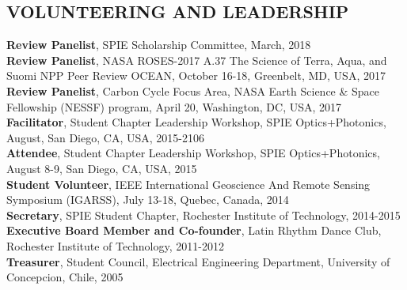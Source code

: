 \documentclass[11pt]{res}
\begin{document}
\begin{resume}
\vspace{-0.1in}
\section{VOLUNTEERING AND LEADERSHIP}
\vspace{0.1in}
{\bf Review Panelist}, SPIE Scholarship Committee, March, 2018
\vspace{0.1in}\\
{\bf Review Panelist}, NASA ROSES-2017 A.37 The Science of Terra, Aqua, and Suomi NPP Peer Review OCEAN, October 16-18, Greenbelt, MD, USA, 2017
\vspace{0.1in}\\
{\bf Review Panelist}, Carbon Cycle Focus Area, NASA Earth Science \& Space Fellowship (NESSF) program, April 20, Washington, DC, USA, 2017
\vspace{0.1in}\\
{\bf Facilitator}, Student Chapter Leadership Workshop, SPIE Optics+Photonics, August, San Diego, CA, USA, 2015-2106
\vspace{0.1in}\\
{\bf Attendee}, Student Chapter Leadership Workshop, SPIE Optics+Photonics, August 8-9, San Diego, CA, USA, 2015
\vspace{0.1in}\\
{\bf Student Volunteer}, IEEE International Geoscience And Remote Sensing Symposium (IGARSS), July 13-18, Quebec, Canada, 2014
\vspace{0.1in}\\
{\bf Secretary}, SPIE Student Chapter, Rochester Institute of Technology, 2014-2015
\vspace{0.1in}\\
{\bf Executive Board Member and Co-founder}, Latin Rhythm Dance Club, Rochester Institute of Technology, 2011-2012
\vspace{0.1in}\\
{\bf Treasurer}, Student Council, Electrical Engineering Department, University of Concepcion, Chile, 2005\\

\end{resume}
\end{document}
